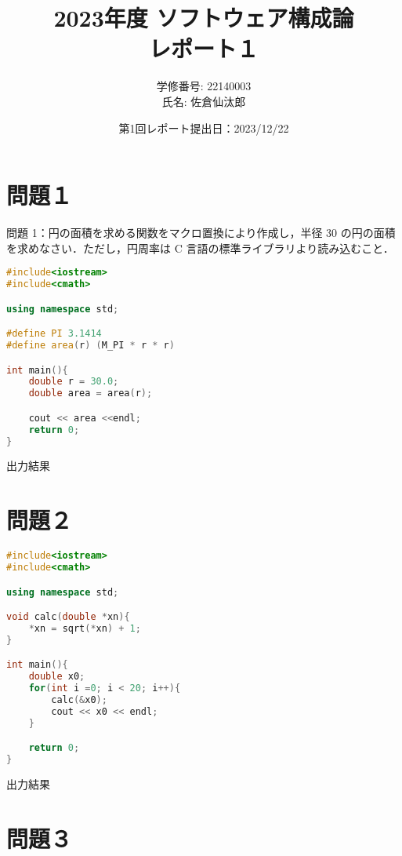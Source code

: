 \documentclass[fleqn, a4paper. 12pt]{ltjsarticle} %
\title{
2023年度 ソフトウェア構成論\\
レポート１}
\author{
学修番号: 22140003 \\
氏名: 佐倉仙汰郎 \\
}
\begin{document}
\date{
第1回レポート提出日：2023/12/22 
}
\maketitle

\newpage

\section{問題１}
問題 1：円の面積を求める関数をマクロ置換により作成し，半径 30 の円の面積を求めなさい．ただし，円周率は C 言語の標準ライブラリより読み込むこと．

\begin{lstlisting}[language = C++]
    #include<iostream>
#include<cmath>

using namespace std;

#define PI 3.1414
#define area(r) (M_PI * r * r)

int main(){
    double r = 30.0;
    double area = area(r);

    cout << area <<endl;
    return 0;
}    
\end{lstlisting}
出力結果


\section{問題２}

\begin{lstlisting}[language = C++]
    #include<iostream>
#include<cmath>

using namespace std;

void calc(double *xn){
    *xn = sqrt(*xn) + 1;
}

int main(){
    double x0;
    for(int i =0; i < 20; i++){
        calc(&x0);
        cout << x0 << endl;
    }

    return 0;
}   
\end{lstlisting}
出力結果


\section{問題３}
\end{document}
